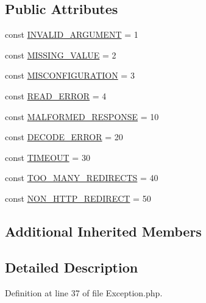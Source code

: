 \subsection*{Public Attributes}
\begin{DoxyCompactItemize}
\item 
const \hyperlink{classHTTP__Request2__Exception_ac3d68c3ce21b962862d90ed021dd037d}{I\-N\-V\-A\-L\-I\-D\-\_\-\-A\-R\-G\-U\-M\-E\-N\-T} = 1
\item 
const \hyperlink{classHTTP__Request2__Exception_af25f90a5d31c28cfc9da9ea7b3b8fbb8}{M\-I\-S\-S\-I\-N\-G\-\_\-\-V\-A\-L\-U\-E} = 2
\item 
const \hyperlink{classHTTP__Request2__Exception_a85fe1066fb01f4686c158674ce561f26}{M\-I\-S\-C\-O\-N\-F\-I\-G\-U\-R\-A\-T\-I\-O\-N} = 3
\item 
const \hyperlink{classHTTP__Request2__Exception_a9167d1901f61ab9f5ec9271b41fe340e}{R\-E\-A\-D\-\_\-\-E\-R\-R\-O\-R} = 4
\item 
const \hyperlink{classHTTP__Request2__Exception_a7c38b52fa885536cee022254f8984ac6}{M\-A\-L\-F\-O\-R\-M\-E\-D\-\_\-\-R\-E\-S\-P\-O\-N\-S\-E} = 10
\item 
const \hyperlink{classHTTP__Request2__Exception_aa993bf6ecf3372cd4fd011492d3d0cbc}{D\-E\-C\-O\-D\-E\-\_\-\-E\-R\-R\-O\-R} = 20
\item 
const \hyperlink{classHTTP__Request2__Exception_a9eff2e63fc4d2ac0e2692610c7709ac9}{T\-I\-M\-E\-O\-U\-T} = 30
\item 
const \hyperlink{classHTTP__Request2__Exception_accfb520aa06566f09fe26138beb3da62}{T\-O\-O\-\_\-\-M\-A\-N\-Y\-\_\-\-R\-E\-D\-I\-R\-E\-C\-T\-S} = 40
\item 
const \hyperlink{classHTTP__Request2__Exception_a9e2ad085db3df15cf825d54e14086b98}{N\-O\-N\-\_\-\-H\-T\-T\-P\-\_\-\-R\-E\-D\-I\-R\-E\-C\-T} = 50
\end{DoxyCompactItemize}
\subsection*{Additional Inherited Members}


\subsection{Detailed Description}


Definition at line 37 of file Exception.\-php.



